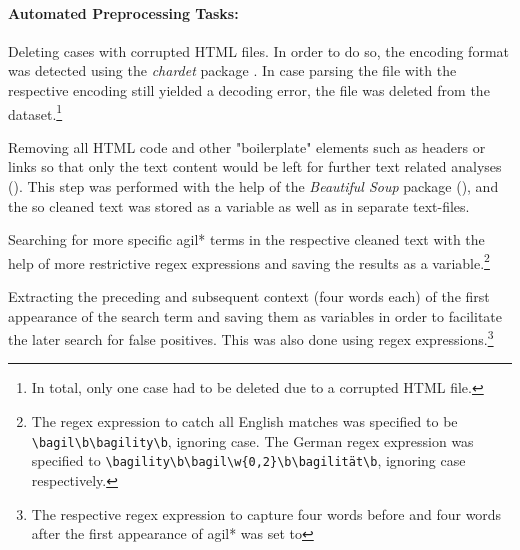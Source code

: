 \paragraph{Automated Preprocessing Tasks:} 
\begin{compactitem}
\item Deleting cases with corrupted HTML files. In order to do so, the encoding format was detected using the \textit{chardet} package \parencite{Pilgrim2015}. In case parsing the file with the respective encoding still yielded a decoding error, the file was deleted from the dataset.\footnote{In total, only one case had to be deleted due to a corrupted HTML file.}
\item Removing all HTML code and other "boilerplate" elements such as headers or links so that only the text content would be left for further text related analyses (\cite*[p. 19]{Ludeling2015}). This step was performed with the help of the \textit{Beautiful Soup} package (\cite{Richardson2007}), and the so cleaned text was stored as a variable as well as in separate text-files.
\item Searching for more specific agil* terms in the respective cleaned text with the help of more restrictive regex expressions and saving the results as a variable.\footnote{The regex expression to catch all English matches was specified to be \texttt{\textbackslash bagil\textbackslash b\textbar \textbackslash bagility\textbackslash b}, ignoring case. The German regex expression was specified to \texttt{\textbackslash bagility\textbackslash b\textbar \textbackslash bagil\textbackslash w\{0,2\}\textbackslash b\textbar \textbackslash bagilität\textbackslash b}, ignoring case respectively.} 
\item Extracting the preceding and subsequent context (four words each) of the first appearance of the search term and saving them as variables in order to facilitate the later search for false positives. This was also done using regex expressions.\footnote{The respective regex expression to capture four words before and four words after the first appearance of agil* was set to }

\end{compactitem}
